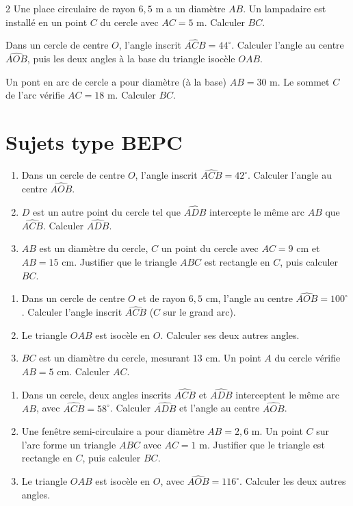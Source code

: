 \begin{multicols}{2}
\exo{} Une place circulaire de rayon $6{,}5$ m a un diamètre $AB$. Un lampadaire
est installé en un point $C$ du cercle avec $AC=5$ m. Calculer $BC$.

\exo{} Dans un cercle de centre $O$, l'angle inscrit $\widehat{ACB}=44^{\circ}$.
Calculer l'angle au centre $\widehat{AOB}$, puis les deux angles à la base du triangle
isocèle $OAB$.

\exo{} Un pont en arc de cercle a pour diamètre (à la base) $AB=30$ m. Le sommet
$C$ de l'arc vérifie $AC=18$ m. Calculer $BC$.

\end{multicols}

\section{Sujets type BEPC}

\begin{enumerate}[label=\arabic*)]
\item Dans un cercle de centre $O$, l'angle inscrit $\widehat{ACB}=42^{\circ}$. Calculer
l'angle au centre $\widehat{AOB}$.
\item $D$ est un autre point du cercle tel que $\widehat{ADB}$ intercepte le même arc $AB$
que $\widehat{ACB}$. Calculer $\widehat{ADB}$.
\item $AB$ est un diamètre du cercle, $C$ un point du cercle avec $AC=9$ cm et $AB=15$ cm.
Justifier que le triangle $ABC$ est rectangle en $C$, puis calculer $BC$.
\end{enumerate}

\begin{enumerate}[label=\arabic*)]
\item Dans un cercle de centre $O$ et de rayon $6{,}5$ cm, l'angle au centre
$\widehat{AOB}=100^{\circ}$. Calculer l'angle inscrit $\widehat{ACB}$ ($C$ sur le grand
arc).
\item Le triangle $OAB$ est isocèle en $O$. Calculer ses deux autres angles.
\item $BC$ est un diamètre du cercle, mesurant $13$ cm. Un point $A$ du cercle vérifie
$AB=5$ cm. Calculer $AC$.
\end{enumerate}

\begin{enumerate}[label=\arabic*)]
\item Dans un cercle, deux angles inscrits $\widehat{ACB}$ et $\widehat{ADB}$ interceptent
le même arc $AB$, avec $\widehat{ACB}=58^{\circ}$. Calculer $\widehat{ADB}$ et l'angle au
centre $\widehat{AOB}$.
\item Une fenêtre semi-circulaire a pour diamètre $AB=2{,}6$ m. Un point $C$ sur l'arc
forme un triangle $ABC$ avec $AC=1$ m. Justifier que le triangle est rectangle en $C$, puis
calculer $BC$.
\item Le triangle $OAB$ est isocèle en $O$, avec $\widehat{AOB}=116^{\circ}$. Calculer les
deux autres angles.
\end{enumerate}

